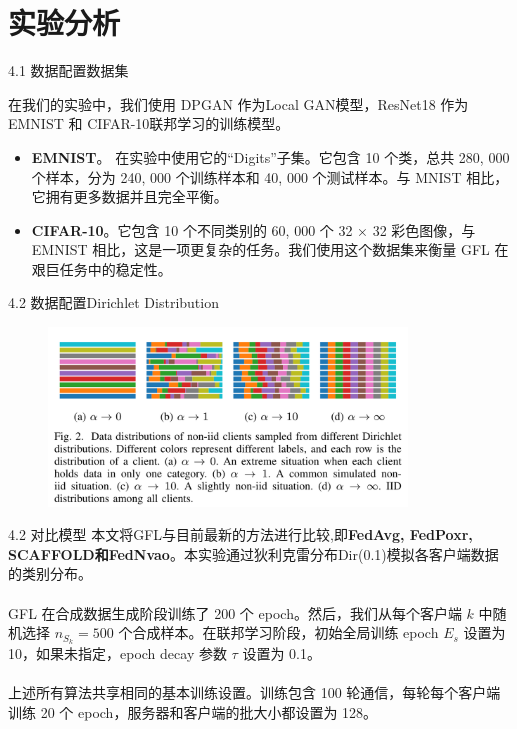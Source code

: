 \documentclass{sintefbeamer}
\theoremstyle{definition}
\begin{document}
\section{实验分析}

\begin{frame}{4.1 数据配置}{数据集}

在我们的实验中，我们使用 DPGAN 作为Local GAN模型，ResNet18 作为 EMNIST 和 CIFAR-10联邦学习的训练模型。

	\begin{itemize}
\item[1)] \textbf{EMNIST}。 在实验中使用它的“Digits”子集。它包含 10 个类，总共 280, 000 个样本，分为 240, 000 个训练样本和 40, 000 个测试样本。与 MNIST 相比，它拥有更多数据并且完全平衡。
\item[2)] \textbf{CIFAR-10}。它包含 10 个不同类别的 60, 000 个 32 × 32 彩色图像，与 EMNIST 相比，这是一项更复杂的任务。我们使用这个数据集来衡量 GFL 在艰巨任务中的稳定性。
\end{itemize}
\end{frame}

\begin{frame}{4.2 数据配置}{Dirichlet Distribution}
\begin{figure}[ht]
\centering
\includegraphics[width=0.85\textwidth]{images/dir}
\end{figure}
\end{frame}


\begin{frame}{4.2 对比模型}
本文将GFL与目前最新的方法进行比较,即\textbf{FedAvg, FedPoxr, SCAFFOLD和FedNvao}。本实验通过狄利克雷分布Dir(0.1)模拟各客户端数据的类别分布。
	\\ \hspace*{\fill} \\
GFL 在合成数据生成阶段训练了 200 个 epoch。然后，我们从每个客户端 $k$ 中随机选择 $n_{S_k}=500$  个合成样本。在联邦学习阶段，初始全局训练 epoch $E_s$ 设置为 10，如果未指定，epoch decay 参数 $\tau$ 设置为 0.1。
	\\ \hspace*{\fill} \\
上述所有算法共享相同的基本训练设置。训练包含 100 轮通信，每轮每个客户端训练 20 个 epoch，服务器和客户端的批大小都设置为 128。
\end{frame}
\end{document}
